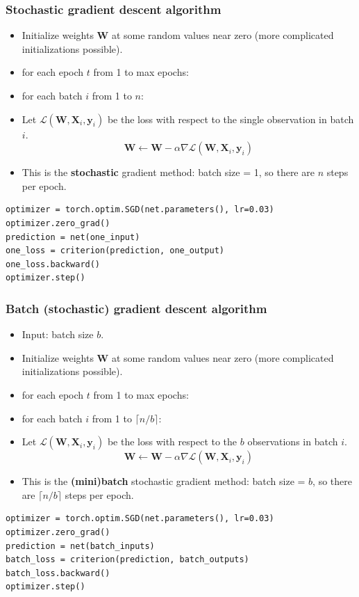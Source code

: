 \documentclass{beamer}
\begin{document}
\begin{frame}[fragile]
  \frametitle{Stochastic gradient descent algorithm}
  \begin{itemize}
  \item Initialize weights $\mathbf W$ at some random values near
    zero (more complicated initializations possible).
  \item for each epoch $t$ from 1 to max epochs:
  \item for each batch $i$ from 1 to $n$:
  \item Let $\mathcal L( \mathbf W, \mathbf X_i, \mathbf y_i )$ be the loss with
    respect to the single observation in batch $i$.
$$
\mathbf W \gets \mathbf W - \alpha \nabla \mathcal L(\mathbf W, \mathbf X_i, \mathbf y_i)
$$
\item This is the \textbf{stochastic} gradient method: batch size = 1,
  so there are $n$ steps per epoch.
\end{itemize}

\begin{verbatim}
optimizer = torch.optim.SGD(net.parameters(), lr=0.03)
optimizer.zero_grad()
prediction = net(one_input)
one_loss = criterion(prediction, one_output)
one_loss.backward()
optimizer.step()
\end{verbatim}

\end{frame}

\begin{frame}[fragile]
  \frametitle{Batch (stochastic) gradient descent algorithm}
  \begin{itemize}
  \item Input: batch size $b$.
  \item Initialize weights $\mathbf W$ at some random values near
    zero (more complicated initializations possible).
  \item for each epoch $t$ from 1 to max epochs:
  \item for each batch $i$ from 1 to $\lceil n/b \rceil$:
  \item Let $\mathcal L( \mathbf W, \mathbf X_i, \mathbf y_i )$ be the loss with
    respect to the $b$ observations in batch $i$.
  $$
\mathbf W \gets \mathbf W - \alpha \nabla \mathcal L(\mathbf W, \mathbf X_i, \mathbf y_i)
$$
\item This is the \textbf{(mini)batch} stochastic gradient method:
  batch size = $b$, so there are $\lceil n/b \rceil$ steps per epoch.
\end{itemize}

\begin{verbatim}
optimizer = torch.optim.SGD(net.parameters(), lr=0.03)
optimizer.zero_grad()
prediction = net(batch_inputs)
batch_loss = criterion(prediction, batch_outputs)
batch_loss.backward()
optimizer.step()
\end{verbatim}

\end{frame}
\end{document}

